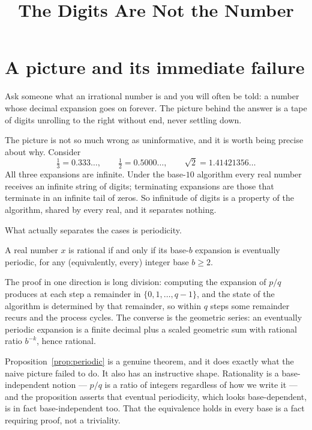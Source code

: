 \documentclass{essay}
\title{The Digits Are Not the Number}
\author{}
\date{}
\begin{document}
\maketitle

\section{A picture and its immediate failure}

Ask someone what an irrational number is and you will often be told: a number
whose decimal expansion goes on forever. The picture behind the answer is a
tape of digits unrolling to the right without end, never settling down.

The picture is not so much wrong as uninformative, and it is worth being
precise about why. Consider
\[ \tfrac{1}{3} = 0.333\ldots, \qquad \tfrac{1}{2} = 0.5000\ldots, \qquad \sqrt{2} = 1.41421356\ldots \]
All three expansions are infinite. Under the base-\(10\) algorithm every real
number receives an infinite string of digits; terminating expansions are those
that terminate in an infinite tail of zeros. So infinitude of digits is a
property of the algorithm, shared by every real, and it separates nothing.

What actually separates the cases is periodicity.

\begin{proposition}\label{prop:periodic}
  A real number \(x\) is rational if and only if its base-\(b\) expansion is
  eventually periodic, for any (equivalently, every) integer base \(b \ge 2\).
\end{proposition}

The proof in one direction is long division: computing the expansion of \(p/q\)
produces at each step a remainder in \(\{0,1,\ldots,q-1\}\), and the state of the
algorithm is determined by that remainder, so within \(q\) steps some remainder
recurs and the process cycles. The converse is the geometric series: an
eventually periodic expansion is a finite decimal plus a scaled geometric sum
with rational ratio \(b^{-k}\), hence rational.

Proposition~\ref{prop:periodic} is a genuine theorem, and it does exactly what
the naive picture failed to do. It also has an instructive shape. Rationality
is a base-independent notion --- \(p/q\) is a ratio of integers regardless of how
we write it --- and the proposition asserts that eventual periodicity, which
looks base-dependent, is in fact base-independent too. That the equivalence
holds in every base is a fact requiring proof, not a triviality.
\end{document}
